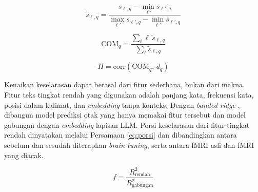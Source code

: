 \begin{equation}
  \tilde{s}_{\ell,q} = \frac{s_{\ell,q} - \min_{\ell'} s_{\ell',q}}{\max_{\ell'} s_{\ell',q} - \min_{\ell'} s_{\ell',q}}
  \label{eq:norm}
\end{equation}

\begin{equation}
  \mathrm{COM}_q = \frac{\sum_{\ell} \ell\, \tilde{s}_{\ell,q}}{\sum_{\ell} \tilde{s}_{\ell,q}}
  \label{eq:com}
\end{equation}

\begin{equation}
  H = \mathrm{corr}\left(\mathrm{COM}_q,\, d_q\right)
  \label{eq:hierarki}
\end{equation}



Kenaikan keselarasan dapat berasal dari fitur sederhana, bukan dari makna. Fitur teks tingkat rendah yang digunakan adalah panjang kata, frekuensi kata, posisi dalam kalimat, dan \textit{embedding} tanpa konteks. Dengan \textit{banded ridge} \autocite{nunez2019banded}, dibangun model prediksi otak yang hanya memakai fitur tersebut dan model gabungan dengan \textit{embedding} lapisan LLM. Porsi keselarasan dari fitur tingkat rendah dinyatakan melalui Persamaan \ref{eq:porsi} dan dibandingkan antara sebelum dan sesudah diterapkan \textit{brain-tuning}, serta antara fMRI asli dan fMRI yang diacak.

\begin{equation}
  f = \frac{R^2_{\text{rendah}}}{R^2_{\text{gabungan}}}
  \label{eq:porsi}
\end{equation}


